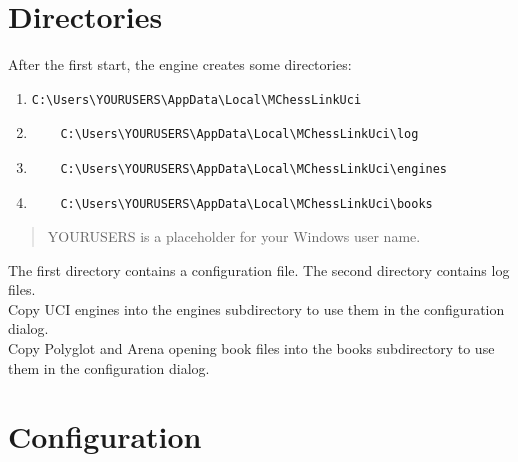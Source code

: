 \documentclass[11pt,a4paper]{article}
\begin{document}
\section{Directories}
After the first start, the engine creates some directories:
\begin{enumerate}
	\item \begin{verbatim}
C:\Users\YOURUSERS\AppData\Local\MChessLinkUci
	\end{verbatim} 
	\item\begin{verbatim}
	C:\Users\YOURUSERS\AppData\Local\MChessLinkUci\log
	\end{verbatim} 
	\item \begin{verbatim}
	C:\Users\YOURUSERS\AppData\Local\MChessLinkUci\engines
	\end{verbatim} 	
		\item \begin{verbatim}
	C:\Users\YOURUSERS\AppData\Local\MChessLinkUci\books
	\end{verbatim} 	
\end{enumerate}
\begin{quote}
YOURUSERS is a placeholder for your Windows user name.
\end{quote}

The first directory contains a configuration file. The second directory contains log files.\\Copy UCI engines into the engines subdirectory to use them in the configuration dialog.\\Copy Polyglot and Arena opening book files into the books subdirectory to use them in the configuration dialog.

\section{Configuration}
\end{document}
